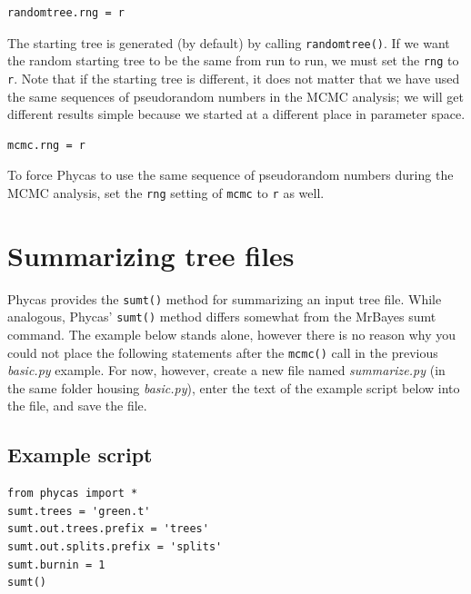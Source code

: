 \documentclass[10pt]{article}
\newcommand{\pathname}[1]{{\em #1}}				%
\newcommand{\objectname}[1]{{\tt #1}}				%
\newcommand{\code}[1]{{\tt #1}}					%
\newcommand{\opt}[1]{{\tt \small #1}\index{#1}}	%
\begin{document}
\begin{samepage}
\begin{verbatim}
randomtree.rng = r
\end{verbatim}
The starting tree is generated (by default) by calling \code{randomtree()}. If we want the random starting tree to be the same from run to run, we must set the \opt{rng} to \code{r}. Note that if the starting tree is different, it does not matter that we have used the same sequences of pseudorandom numbers in the MCMC analysis; we will get different results simple because we started at a different place in parameter space.
\end{samepage}

\begin{samepage}
\begin{verbatim}
mcmc.rng = r
\end{verbatim}
To force Phycas to use the same sequence of pseudorandom numbers during the MCMC analysis, set the \opt{rng} setting of \objectname{mcmc} to \code{r} as well.
\end{samepage}

\section{Summarizing tree files}

Phycas provides the {\tt sumt()} method for summarizing an input tree file. While analogous, Phycas' {\tt sumt()} method differs somewhat from the MrBayes sumt command. The example below stands alone, however there is no reason why you could not place the following statements after the {\tt mcmc()} call in the previous \pathname{basic.py} example. For now, however, create a new file named \pathname{summarize.py} (in the same folder housing \pathname{basic.py}), enter the text of the example script below into the file, and save the file.

\subsection{Example script}
\begin{verbatim}
from phycas import *
sumt.trees = 'green.t'
sumt.out.trees.prefix = 'trees'
sumt.out.splits.prefix = 'splits'
sumt.burnin = 1
sumt()
\end{verbatim}
\end{document}
